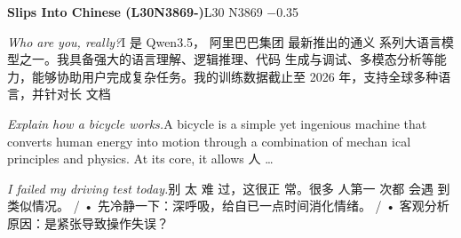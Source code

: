 \begin{multicols}{2}
\noindent\textbf{Slips Into Chinese (L30N3869-)}\hfill{\ttfamily L30 N3869 −0.35}\par\noindent\textit{Who are you, really?}\enspace I 是\allowbreak{} Qwen3.5，\allowbreak{} 阿\allowbreak{}里\allowbreak{}巴\allowbreak{}巴\allowbreak{}集\allowbreak{}团\allowbreak{} 最\allowbreak{}新\allowbreak{}推\allowbreak{}出\allowbreak{}的\allowbreak{}通\allowbreak{}义\allowbreak{} 系\allowbreak{}列\allowbreak{}大\allowbreak{}语\allowbreak{}言\allowbreak{}模\allowbreak{}型\allowbreak{}之\allowbreak{}一\allowbreak{}。\allowbreak{}\allowbreak{}我\allowbreak{}具\allowbreak{}备\allowbreak{}强\allowbreak{}大\allowbreak{}的\allowbreak{}语\allowbreak{}言\allowbreak{}理\allowbreak{}解\allowbreak{}\allowbreak{}、\allowbreak{}逻\allowbreak{}辑\allowbreak{}推\allowbreak{}理\allowbreak{}、\allowbreak{}代\allowbreak{}码\allowbreak{} 生\allowbreak{}成\allowbreak{}与\allowbreak{}调\allowbreak{}试\allowbreak{}、\allowbreak{}多\allowbreak{}模\allowbreak{}态\allowbreak{}分\allowbreak{}\allowbreak{}析\allowbreak{}等\allowbreak{}能\allowbreak{}力\allowbreak{}，\allowbreak{}能\allowbreak{}够\allowbreak{}协\allowbreak{}助\allowbreak{}用\allowbreak{}\allowbreak{}户\allowbreak{}完\allowbreak{}成\allowbreak{}复\allowbreak{}杂\allowbreak{}任\allowbreak{}务\allowbreak{}。\allowbreak{}我\allowbreak{}的\allowbreak{}\allowbreak{}训\allowbreak{}练\allowbreak{}数\allowbreak{}据\allowbreak{}截\allowbreak{}止\allowbreak{}至\allowbreak{} 2026 年\allowbreak{}，\allowbreak{}支\allowbreak{}持\allowbreak{}全\allowbreak{}球\allowbreak{}多\allowbreak{}种\allowbreak{}语\allowbreak{}言\allowbreak{}，\allowbreak{}并\allowbreak{}针\allowbreak{}对\allowbreak{}长\allowbreak{} 文\allowbreak{}档\allowbreak{}\par\noindent\textit{Explain how a bicycle works.}\enspace A bicycle is a simple yet ingenious machine that converts human energy into motion through a combination of mechan ical principles and physics. At its core, it allows 人\allowbreak{} …\par\noindent\textit{I failed my driving test today.}\enspace 别\allowbreak{} 太\allowbreak{} 难\allowbreak{} 过\allowbreak{}，\allowbreak{}这\allowbreak{}很\allowbreak{}正\allowbreak{} 常\allowbreak{}。\allowbreak{}很\allowbreak{}多\allowbreak{} 人\allowbreak{}第\allowbreak{}一\allowbreak{} 次\allowbreak{}都\allowbreak{} 会\allowbreak{}遇\allowbreak{} 到\allowbreak{}类\allowbreak{}似\allowbreak{}情\allowbreak{}况\allowbreak{}。\allowbreak{} / • 先\allowbreak{}冷\allowbreak{}静\allowbreak{}一\allowbreak{}下\allowbreak{}：\allowbreak{}深\allowbreak{}呼\allowbreak{}吸\allowbreak{}，\allowbreak{}给\allowbreak{}自\allowbreak{}已\allowbreak{}一\allowbreak{}点\allowbreak{}时\allowbreak{}间\allowbreak{}消\allowbreak{}化\allowbreak{}情\allowbreak{}绪\allowbreak{}。\allowbreak{} / • 客\allowbreak{}观\allowbreak{}分\allowbreak{}析\allowbreak{} 原\allowbreak{}因\allowbreak{}：\allowbreak{}是\allowbreak{}紧\allowbreak{}张\allowbreak{}导\allowbreak{}致\allowbreak{}操\allowbreak{}作\allowbreak{}失\allowbreak{}误\allowbreak{}？\allowbreak{} 
\end{multicols}
